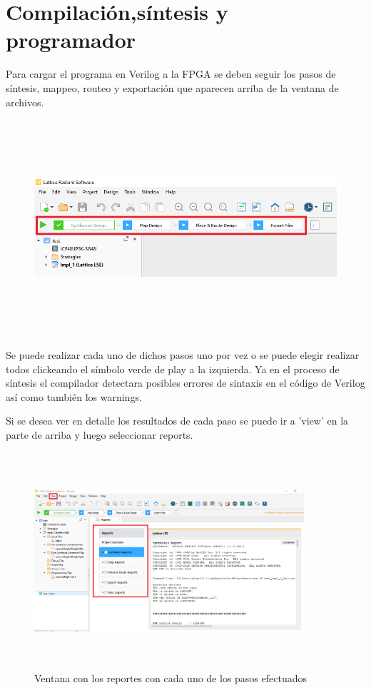 \documentclass{article}
\begin{document}
\section{Compilación,síntesis y programador}
Para cargar el programa en Verilog a la FPGA se deben seguir los pasos de síntesis, mappeo, routeo y exportación que aparecen arriba de la ventana de archivos.
	\begin{figure}[H]
 	\centering
	\includegraphics[height=8cm, width=\textwidth]{Imagenes/SintesisRouteo.png}
	\end{figure}
Se puede realizar cada uno de dichos pasos uno por vez o se puede elegir realizar todos clickeando el símbolo verde de play a la izquierda. Ya en el proceso de síntesis el compilador detectara posibles errores de sintaxis en el código de Verilog así como también los warnings.

Si se desea ver en detalle los resultados de cada paso se puede ir a 'view' en la parte de arriba y luego seleccionar reports.
	\begin{figure}[H]
 	\centering
	\includegraphics[height=8cm, width=10cm]{Imagenes/reports.png}
	\caption{Ventana con los reportes con cada uno de los pasos efectuados}
	\end{figure}
	
\end{document}
